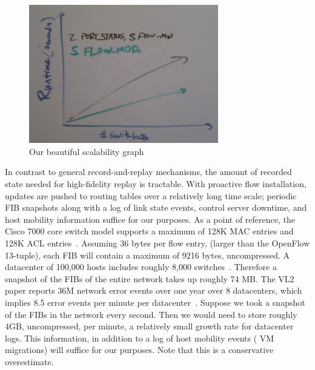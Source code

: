 \begin{figure}[t]
    \includegraphics[width=3.25in]{../graphs/mock_simulator_scalability.jpg}
    \caption[]{\label{fig:scalability} Our beautiful scalability graph}
\end{figure}

 In contrast to general record-and-replay
mechanisms, the amount of recorded state needed for
high-fidelity replay is tractable. With proactive flow installation, 
updates are pushed to routing tables over a relatively long time scale; periodic
FIB snapshots along with a log of link state events, control server
downtime, and host mobility information suffice for our purposes. As a point of reference, the Cisco 7000 
core switch model supports a maximum of 128K MAC entries and
128K ACL entries~\cite{cisco7000}. Assuming 36 bytes per flow entry,
(larger than the OpenFlow 13-tuple), each FIB will contain a maximum of 9216
bytes, uncompressed. A datacenter of 100,000
hosts includes roughly 8,000
switches~\cite{Al-Fares:2008:SCD:1402958.1402967}.
Therefore a snapshot of the FIBs of the entire network takes up roughly 74 MB.
The VL2 paper reports 36M network error events over one year over 8
datacenters, which implies 8.5 error events per minute per
datacenter~\cite{Greenberg:2009:VSF:1592568.1592576}.
Suppose we took a snapshot of the FIBs in the network every second. 
Then we would need to store roughly 4GB, uncompressed, per minute, a relatively small growth 
rate for datacenter logs. This information, in addition to a log of host
mobility events (\eg{} VM migrations) will suffice for our purposes. Note that this is a conservative overestimate.


